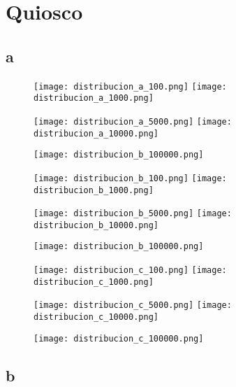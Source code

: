 \chapter{Quiosco}

\newpage

\section{a}

\begin{figure}[h]
	\texttt{[image: distribucion\_a\_100.png]}
	\texttt{[image: distribucion\_a\_1000.png]}
\end{figure}
\begin{figure}[h]
	\texttt{[image: distribucion\_a\_5000.png]}
	\texttt{[image: distribucion\_a\_10000.png]}
\end{figure}
\begin{figure}[h]
	\texttt{[image: distribucion\_b\_100000.png]}
\end{figure}
\begin{figure}[h]
	\texttt{[image: distribucion\_b\_100.png]}
	\texttt{[image: distribucion\_b\_1000.png]}
\end{figure}
\begin{figure}[h]
	\texttt{[image: distribucion\_b\_5000.png]}
	\texttt{[image: distribucion\_b\_10000.png]}
\end{figure}
\begin{figure}[h]
	\texttt{[image: distribucion\_b\_100000.png]}
\end{figure}
\begin{figure}[h]
	\texttt{[image: distribucion\_c\_100.png]}
	\texttt{[image: distribucion\_c\_1000.png]}
\end{figure}
\begin{figure}[h]
	\texttt{[image: distribucion\_c\_5000.png]}
	\texttt{[image: distribucion\_c\_10000.png]}
\end{figure}
\begin{figure}[h]
	\texttt{[image: distribucion\_c\_100000.png]}
\end{figure}

\newpage

\section{b}

